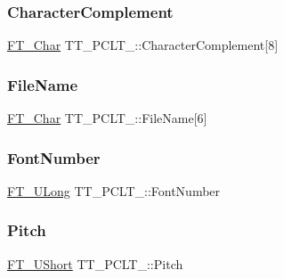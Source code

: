 \subsubsection{\texorpdfstring{Character\+Complement}{CharacterComplement}}
{\footnotesize\ttfamily \hyperlink{fttypes_8h_a0f851552b050883885f0a0855771f39d}{F\+T\+\_\+\+Char} T\+T\+\_\+\+P\+C\+L\+T\+\_\+\+::\+Character\+Complement\mbox{[}8\mbox{]}}

\mbox{\label{struct_t_t___p_c_l_t___a87691bde7cb06e3043f5320c8223e768}} 
\subsubsection{\texorpdfstring{File\+Name}{FileName}}
{\footnotesize\ttfamily \hyperlink{fttypes_8h_a0f851552b050883885f0a0855771f39d}{F\+T\+\_\+\+Char} T\+T\+\_\+\+P\+C\+L\+T\+\_\+\+::\+File\+Name\mbox{[}6\mbox{]}}

\mbox{\label{struct_t_t___p_c_l_t___a1465aa1ea82df2be913eb64498fe3d94}} 
\subsubsection{\texorpdfstring{Font\+Number}{FontNumber}}
{\footnotesize\ttfamily \hyperlink{fttypes_8h_a4fac88bdba78eb76b505efa6e4fbf3f5}{F\+T\+\_\+\+U\+Long} T\+T\+\_\+\+P\+C\+L\+T\+\_\+\+::\+Font\+Number}

\mbox{\label{struct_t_t___p_c_l_t___ae8134f929d7a259c081fe28e9b5cf53d}} 
\subsubsection{\texorpdfstring{Pitch}{Pitch}}
{\footnotesize\ttfamily \hyperlink{fttypes_8h_a937f6c17cf5ffd09086d8610c37b9f58}{F\+T\+\_\+\+U\+Short} T\+T\+\_\+\+P\+C\+L\+T\+\_\+\+::\+Pitch}


